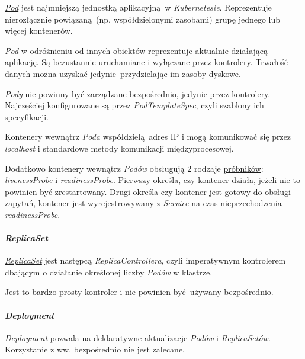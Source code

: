 \documentclass[a4paper,12pt,twoside,openany]{report}
\begin{document}
\href{https://kubernetes.io/docs/concepts/workloads/pods/pod-overview/}{\emph{Pod}}
jest najmniejszą jednostką aplikacyjną~w \emph{Kubernetesie}.
Reprezentuje nierozłącznie powiązaną~(np. współdzielonymi zasobami)
grupę jednego lub więcej kontenerów.

\emph{Pod} w odróżnieniu od innych obiektów reprezentuje aktualnie
działającą aplikację. Są bezustannie uruchamiane i wyłączane przez
kontrolery. Trwałość danych można uzyskać jedynie~przydzielając im
zasoby dyskowe.

\emph{Pody} nie powinny być zarządzane bezpośrednio, jedynie przez
kontrolery. Najczęściej konfigurowane są przez \emph{PodTemplateSpec},
czyli szablony ich specyfikacji.

Kontenery wewnątrz \emph{Poda} współdzielą~adres IP i mogą komunikować
się przez \emph{localhost} i standardowe metody komunikacji
międzyprocesowej.

Dodatkowo kontenery wewnątrz \emph{Podów} obsługują 2 rodzaje
\href{https://kubernetes.io/docs/concepts/workloads/pods/pod-lifecycle/\#container-probes}{próbników}:
\emph{livenessProbe} i \emph{readinessProbe}. Pierwszy określa, czy
kontener działa, jeżeli nie to powinien być zrestartowany. Drugi określa
czy kontener jest gotowy do obsługi zapytań, kontener jest
wyrejestrowywany z \emph{Service} na czas nieprzechodzenia
\emph{readinessProbe}.

\hypertarget{replicaset}{%
\paragraph{\texorpdfstring{\emph{ReplicaSet}}{ReplicaSet}}\label{replicaset}}

\href{https://kubernetes.io/docs/concepts/workloads/controllers/replicaset/}{\emph{ReplicaSet}}
jest następcą \emph{ReplicaControllera}, czyli imperatywnym kontrolerem
dbającym o działanie określonej liczby \emph{Podów} w klastrze.

Jest to bardzo prosty kontroler i nie powinien być~używany bezpośrednio.

\hypertarget{deployment}{%
\paragraph{\texorpdfstring{\emph{Deployment}}{Deployment}}\label{deployment}}

\href{https://kubernetes.io/docs/concepts/workloads/controllers/deployment/}{\emph{Deployment}}
pozwala na deklaratywne aktualizacje \emph{Podów} i \emph{ReplicaSetów}.
Korzystanie z ww. bezpośrednio nie jest zalecane.
\end{document}
